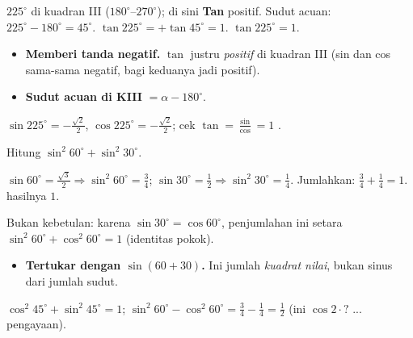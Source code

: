 \jawab
{} $225^\circ$ di kuadran III ($180^\circ$--$270^\circ$); di sini
\textbf{Tan} positif.
 Sudut acuan: $225^\circ-180^\circ=45^\circ$.
 $\tan225^\circ=+\tan45^\circ=1$.
\jadi $\tan225^\circ=1$.

\begin{jebakan}
\begin{itemize}[leftmargin=*,topsep=2pt]
  \item \textbf{Memberi tanda negatif.} $\tan$ justru \emph{positif} di kuadran
  III (sin dan cos sama-sama negatif, bagi keduanya jadi positif).
  \item \textbf{Sudut acuan di KIII} $=\alpha-180^\circ$.
\end{itemize}
\end{jebakan}

\begin{variasi}
$\sin225^\circ=-\frac{\sqrt2}{2}$, $\cos225^\circ=-\frac{\sqrt2}{2}$;
cek $\tan=\frac{\sin}{\cos}=1$ \checkmark.
\end{variasi}

\begin{soalbox}{}
Hitung $\sin^2 60^\circ+\sin^2 30^\circ$.
\end{soalbox}

\jawab
{} $\sin60^\circ=\frac{\sqrt3}{2}\Rightarrow\sin^2 60^\circ=\frac34$;
$\sin30^\circ=\frac12\Rightarrow\sin^2 30^\circ=\frac14$.
 Jumlahkan: $\frac34+\frac14=1$.
\jadi hasilnya $1$.

\begin{tips}
Bukan kebetulan: karena $\sin30^\circ=\cos60^\circ$, penjumlahan ini setara
$\sin^2 60^\circ+\cos^2 60^\circ=1$ (identitas pokok).
\end{tips}

\begin{jebakan}
\begin{itemize}[leftmargin=*,topsep=2pt]
  \item \textbf{Tertukar dengan $\sin(60+30)$.} Ini jumlah \emph{kuadrat nilai},
  bukan sinus dari jumlah sudut.
\end{itemize}
\end{jebakan}

\begin{variasi}
$\cos^2 45^\circ+\sin^2 45^\circ=1$; $\sin^2 60^\circ-\cos^2 60^\circ
=\frac34-\frac14=\frac12$ (ini $\cos2\cdot? $ ... pengayaan).
\end{variasi}

